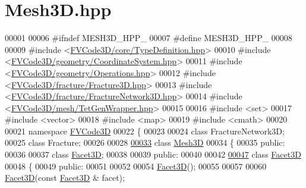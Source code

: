 \hypertarget{Mesh3D_8hpp_source}{}\section{Mesh3\+D.\+hpp}
\label{Mesh3D_8hpp_source}

\begin{DoxyCode}
00001 
00006 \textcolor{preprocessor}{#ifndef MESH3D\_HPP\_}
00007 \textcolor{preprocessor}{#define MESH3D\_HPP\_}
00008 
00009 \textcolor{preprocessor}{#include <\hyperlink{TypeDefinition_8hpp}{FVCode3D/core/TypeDefinition.hpp}>}
00010 \textcolor{preprocessor}{#include <\hyperlink{CoordinateSystem_8hpp}{FVCode3D/geometry/CoordinateSystem.hpp}>}
00011 \textcolor{preprocessor}{#include <\hyperlink{Operations_8hpp}{FVCode3D/geometry/Operations.hpp}>}
00012 \textcolor{preprocessor}{#include <\hyperlink{Fracture3D_8hpp}{FVCode3D/fracture/Fracture3D.hpp}>}
00013 \textcolor{preprocessor}{#include <\hyperlink{FractureNetwork3D_8hpp}{FVCode3D/fracture/FractureNetwork3D.hpp}>}
00014 \textcolor{preprocessor}{#include <\hyperlink{TetGenWrapper_8hpp}{FVCode3D/mesh/TetGenWrapper.hpp}>}
00015 
00016 \textcolor{preprocessor}{#include <set>}
00017 \textcolor{preprocessor}{#include <vector>}
00018 \textcolor{preprocessor}{#include <map>}
00019 \textcolor{preprocessor}{#include <cmath>}
00020 
00021 \textcolor{keyword}{namespace }\hyperlink{namespaceFVCode3D}{FVCode3D}
00022 \{
00023 
00024 \textcolor{keyword}{class }FractureNetwork3D;
00025 \textcolor{keyword}{class }Fracture;
00026 
00028 
\hypertarget{Mesh3D_8hpp_source.tex_l00033}{}\hyperlink{classFVCode3D_1_1Mesh3D}{00033} \textcolor{keyword}{class }\hyperlink{classFVCode3D_1_1Mesh3D}{Mesh3D}
00034 \{
00035 \textcolor{keyword}{public}:
00036 
00037     \textcolor{keyword}{class }\hyperlink{classFVCode3D_1_1Mesh3D_1_1Facet3D}{Facet3D};
00038 
00039 \textcolor{keyword}{public}:
00040 
00042 
\hypertarget{Mesh3D_8hpp_source.tex_l00047}{}\hyperlink{classFVCode3D_1_1Mesh3D_1_1Facet3D}{00047}     \textcolor{keyword}{class }\hyperlink{classFVCode3D_1_1Mesh3D_1_1Facet3D}{Facet3D}
00048     \{
00049     \textcolor{keyword}{public}:
00051 
00052 
00054         \hyperlink{classFVCode3D_1_1Mesh3D_1_1Facet3D_a6a7aee209946492b9b0d31e04e33a290}{Facet3D}();
00055 
00057 
00060         \hyperlink{classFVCode3D_1_1Mesh3D_1_1Facet3D_a6a7aee209946492b9b0d31e04e33a290}{Facet3D}(\textcolor{keyword}{const} \hyperlink{classFVCode3D_1_1Mesh3D_1_1Facet3D}{Facet3D} & facet);

\end{DoxyCode}
